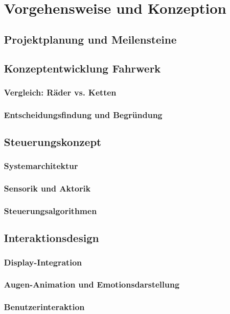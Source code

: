 \chapter{Vorgehensweise und Konzeption}
\label{cha:vorgehen}

\section{Projektplanung und Meilensteine}

\section{Konzeptentwicklung Fahrwerk}
\subsection{Vergleich: Räder vs. Ketten}
\subsection{Entscheidungsfindung und Begründung}

\section{Steuerungskonzept}
\subsection{Systemarchitektur}
\subsection{Sensorik und Aktorik}
\subsection{Steuerungsalgorithmen}

\section{Interaktionsdesign}
\subsection{Display-Integration}
\subsection{Augen-Animation und Emotionsdarstellung}
\subsection{Benutzerinteraktion}


